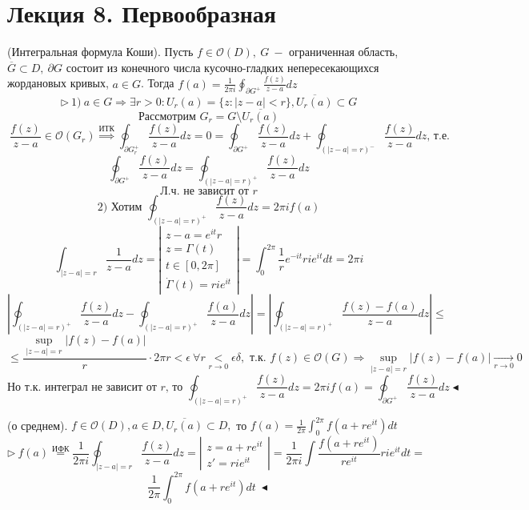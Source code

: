 \section{Лекция 8. Первообразная}
 (Интегральная формула Коши). Пусть $f \in \mathcal{O} (D),\  G \ -$ ограниченная область, $\overline{G} \subset D, \ \partial G $
 состоит из конечного числа кусочно-гладких непересекающихся жордановых кривых, $a \in G$. Тогда $f(a) = \frac{1}{2\pi i} \oint_{\partial G^+} \frac{f(z)}{z-a} dz$
\[\triangleright \ 1) \ a \in G \Rightarrow \exists r > 0: U_r(a) = \{z: |z-a| < r\}, \overline{U_r(a)} \subset G\]
\[\text{Рассмотрим } G_r = G \setminus \overline{U_r(a)}\] 
\[\ \frac{f(z)}{z-a} \in \mathcal{O}(G_r) \overset{\text{ИТК}}{\Rightarrow} \oint_{\partial G_r^+} \frac{f(z)}{z-a} dz = 0 = \oint_{\partial G^+}\frac{f(z)}{z-a}dz + \oint_{(|z-a|=r)^-} \frac{f(z)}{z-a}dz \text{, т.е. }\] 
\[\oint_{\partial G^+} \frac{f(z)}{z-a}dz = \oint_{(|z-a|=r)^+} \frac{f(z)}{z-a}dz\]
\[\text{Л.ч. не зависит от } r\]
\[2) \text{ Хотим } \oint_{(|z-a|=r)^+}\frac{f(z)}{z-a}dz = 2\pi i f(a)\]
\[\int_{|z-a|=r} \frac{1}{z-a}dz = \left|\begin{array}{ll}
z-a=e^{it}r \\
z = \Gamma(t) \\
t \in [0, 2\pi] \\
\dot{\Gamma}(t) = rie^{it}    
\end{array}\right| = \int_0^{2\pi} \frac{1}{r} e^{-it} rie^{it} dt = 2\pi i\]
\[\left|\oint_{(|z-a|=r)^+}\frac{f(z)}{z-a}dz - \oint_{(|z-a|=r)^+}\frac{f(a)}{z-a}dz\right| =\left|\oint_{(|z-a|=r)^+}\frac{f(z)-f(a)}{z-a}dz\right| \leq\]
\[\leq \frac{\sup_{|z-a|=r}\left|f(z)-f(a)\right|}{r} \cdot 2\pi r < \epsilon \ \forall r \underset{r\to 0}{<} \epsilon \delta, \text{ т.к. }f(z) \in \mathcal{O}(G) \Rightarrow \sup_{|z-a|=r}|f(z)-f(a)| \underset{r\to 0}{\to} 0\]
\[\text{Но т.к. интеграл не зависит от $r$, то } \oint_{(|z-a|=r)^+}\frac{f(z)}{z-a}dz = 2\pi if(a) = \oint_{\partial G^+} \frac{f(z)}{z-a}dz\blacktriangleleft\]

 (о среднем).
$f \in \mathcal{O}(D), a \in D, \overline{U_r(a)} \subset D,$ то $f(a) = \frac{1}{2\pi} \int_0^{2\pi} f(a+re^{it})dt$
\[\triangleright \ f(a) \overset{\text{ИФК}}{=} \frac{1}{2\pi i} \oint_{|z-a|=r} \frac{f(z)}{z-a} dz = \left|\begin{array}{ll}
    z = a + re^{it} \\
    z' = rie^{it}    
\end{array}\right| = \frac{1}{2\pi i} \int \frac{f(a+re^{it})}{re^{it}}rie^{it} dt =\] 
\[\frac{1}{2\pi} \int_0^{2\pi} f(a+re^{it})dt \ \blacktriangleleft\]

